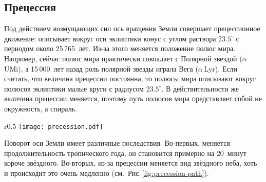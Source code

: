 \subsection{Прецессия}

Под действием возмущающих сил ось вращения Земли совершает прецессионное движение: описывает вокруг оси эклиптики конус с углом раствора $23.5^\circ$ с периодом около  25\,765~лет. Из-за этого меняется положение полюс мира. Например, сейчас полюс мира практически совпадает с Полярной звездой ($\alpha$\,UMi), а 15\,000~лет назад роль полярной звезды играла Вега ($\alpha$\,Lyr). Если считать, что величина прецессии постоянна, то полюсы мира описывают вокруг полюсов эклиптики малые круги с радиусом $23.5^\circ$. В действительности же величина прецессии меняется, поэтому путь полюсов мира представляет собой не окружность, а спираль.

\begin{wrapfigure}[16]{r}{0.5\tw}
	\texttt{[image: precession.pdf]}
	\caption{Прецессионное движение северного полюса мира}
	\label{fig:precession-path}
\end{wrapfigure}
Поворот оси Земли имеет различные последствия. Во-первых, меняется продолжительность тропического года, он становится примерно на $20$~минут короче звёздного. Во-вторых, из-за прецессии меняется вид звёздного неба, хоть и происходит это очень медленно (см.~Рис.\,\ref{fig:precession-path}).